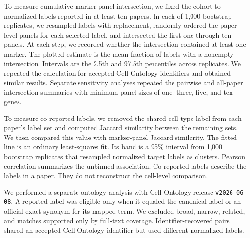 \documentclass[10pt,twocolumn]{article}
\theoremstyle{plain}
\theoremstyle{definition}
\theoremstyle{remark}
\begin{document}
To measure cumulative marker-panel intersection, we fixed the cohort to normalized labels reported in at least ten papers. In each of 1{,}000 bootstrap replicates, we resampled labels with replacement, randomly ordered the paper-level panels for each selected label, and intersected the first one through ten panels. At each step, we recorded whether the intersection contained at least one marker. The plotted estimate is the mean fraction of labels with a nonempty intersection. Intervals are the 2.5th and 97.5th percentiles across replicates. We repeated the calculation for accepted Cell Ontology identifiers and obtained similar results. Separate sensitivity analyses repeated the pairwise and all-paper intersection summaries with minimum panel sizes of one, three, five, and ten genes.

To measure co-reported labels, we removed the shared cell type label from each paper's label set and computed Jaccard similarity between the remaining sets. We then compared this value with marker-panel Jaccard similarity. The fitted line is an ordinary least-squares fit. Its band is a 95\% interval from 1{,}000 bootstrap replicates that resampled normalized target labels as clusters. Pearson correlation summarizes the unbinned association. Co-reported labels describe the labels in a paper. They do not reconstruct the cell-level comparison.

We performed a separate ontology analysis with Cell Ontology release \texttt{v2026-06-08}. A reported label was eligible only when it equaled the canonical label or an official exact synonym for its mapped term. We excluded broad, narrow, related, and matches supported only by full-text coverage. Identifier-recovered pairs shared an accepted Cell Ontology identifier but used different normalized labels. 
\end{document}

